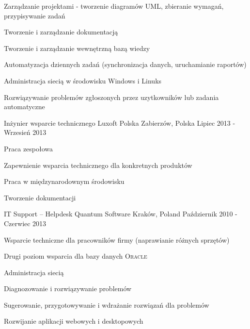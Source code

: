 \begin{cventries}
{\begin{cvitems}
				\item {Zarządzanie projektami - tworzenie diagramów \textsc{UML}, zbieranie wymagań, przypisywanie zadań}
				\item {Tworzenie i zarządzanie dokumentacją}
				\item {Tworzenie i zarządzanie wewnętrzną bazą wiedzy}
				\item {Automatyzacja dziennych zadań (synchronizacja danych, uruchamianie raportów)}
				\item {Administracja siecią w środowisku Windows i Linuks}
				\item {Rozwiązywanie problemów zgłoszonych przez uzytkowników lub zadania automatyczne}
			\end{cvitems}
		}
  	\cventry
		{Inżynier wsparcie technicznego} 
		{Luxoft Polska}
		{Zabierzów, Polska} 
		{Lipiec 2013 - Wrzesień 2013} 
		{
			\begin{cvitems} 
				\item {Praca zespołowa}
	   			\item {Zapewnienie wsparcia technicznego dla konkretnych produktów}
	   			\item {Praca w międzynarodownym środowisku}
				\item {Tworzenie dokumentacji}
			\end{cvitems}
		}
  	\cventry
		{IT Support -- Helpdesk}
		{Quantum Software} 
		{Kraków, Poland} 
		{Październik 2010 - Czerwiec 2013}
		{
			\begin{cvitems} 
				\item {Wsparcie techniczne dla pracowników firmy (naprawianie różnych sprzętów)}
				\item {Drugi poziom wsparcia dla bazy danych \textsc{Oracle}}
				\item {Administracja siecią}
				\item {Diagnozowanie i rozwiązywanie problemów}
				\item {Sugerowanie, przygotowywanie i wdrażanie rozwiązań dla problemów}
				\item {Rozwijanie aplikacji webowych i desktopowych}
			\end{cvitems}
		}
\end{cventries}
